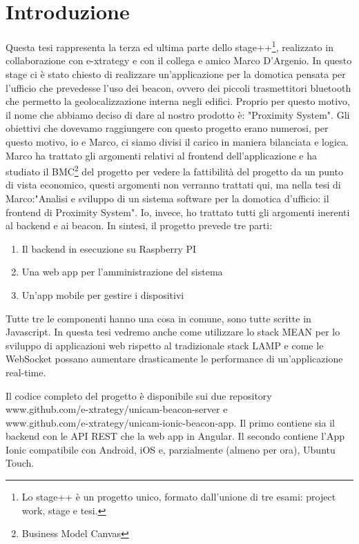 \chapter{Introduzione}
\label{chap:intro}

Questa tesi rappresenta la terza ed ultima parte dello stage++\footnote{Lo stage++ è un progetto unico, formato dall'unione di tre esami: project work, stage e tesi.},
realizzato in collaborazione con e-xtrategy e con il collega e amico Marco D'Argenio.
In questo stage ci è stato chiesto di realizzare un'applicazione per la domotica pensata per l'ufficio che prevedesse l'uso dei beacon, ovvero dei piccoli trasmettitori bluetooth che permetto la geolocalizzazione interna negli edifici. Proprio per questo motivo, il nome che abbiamo deciso di dare al nostro prodotto è: "Proximity System".
Gli obiettivi che dovevamo raggiungere con questo progetto erano numerosi, per questo motivo, io e Marco, ci siamo divisi il carico in maniera bilanciata e logica.
Marco ha trattato gli argomenti relativi al frontend dell'applicazione e ha studiato il BMC\footnote{Business Model Canvas} del progetto per vedere la fattibilità del  progetto da un punto di vista economico, questi argomenti non verranno trattati qui, ma nella tesi di Marco:"Analisi e sviluppo di un sistema software per la domotica d'ufficio: il frontend di Proximity System".
Io, invece, ho trattato tutti gli argomenti inerenti al backend e ai beacon. 
In sintesi, il progetto prevede tre parti: 
\begin{enumerate}
\item Il backend in esecuzione su Raspberry PI
\item Una web app per l'amministrazione del sistema
\item Un'app mobile per gestire i dispositivi
\end{enumerate}
Tutte tre le componenti hanno una cosa in comune, sono tutte scritte in Javascript.
In questa tesi vedremo anche come utilizzare lo stack MEAN per lo sviluppo di applicazioni web rispetto al tradizionale stack LAMP e come le WebSocket possano aumentare drasticamente le performance di un'applicazione real-time.

Il codice completo del progetto è disponibile sui due repository\\ www.github.com/e-xtrategy/unicam-beacon-server e\\ www.github.com/e-xtrategy/unicam-ionic-beacon-app. 
Il primo contiene sia il backend con le API REST che la web app in Angular.
Il secondo contiene l'App Ionic compatibile con Android, iOS e, parzialmente (almeno per ora), Ubuntu Touch. 

